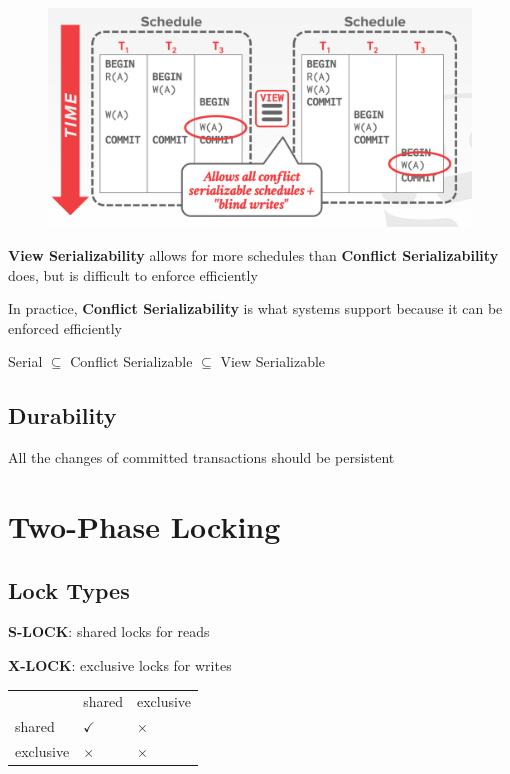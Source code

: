 \documentclass[11pt]{article}
\begin{document}
\begin{figure}[htbp]
\centering
\includegraphics[width=.8\textwidth]{../images/15445/56.png}
\label{}
\end{figure}

\textbf{View Serializability} allows for more schedules than \textbf{Conflict Serializability} does, but is
difficult to enforce efficiently

In practice, \textbf{Conflict Serializability} is what systems support because it can be enforced efficiently


Serial \(\subseteq\) Conflict Serializable \(\subseteq\) View Serializable
\subsection{Durability}
\label{sec:org8c4b17c}
All the changes of committed transactions should be persistent
\section{Two-Phase Locking}
\label{sec:org9c0c171}
\subsection{Lock Types}
\label{sec:orgb8eb91b}
\textbf{S-LOCK}: shared locks for reads

\textbf{X-LOCK}: exclusive locks for writes

\begin{center}
\begin{tabular}{lll}
 & shared & exclusive\\
shared & \(\checkmark\) & \(\times\)\\
exclusive & \(\times\) & \(\times\)\\
\end{tabular}
\end{center}
\end{document}
